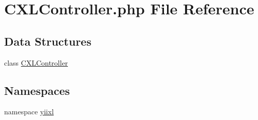 \hypertarget{CXLController_8php}{
\section{CXLController.php File Reference}
\label{CXLController_8php}
}
\subsection*{Data Structures}
\begin{DoxyCompactItemize}
\item 
class \hyperlink{classCXLController}{CXLController}
\end{DoxyCompactItemize}
\subsection*{Namespaces}
\begin{DoxyCompactItemize}
\item 
namespace \hyperlink{namespaceyiixl}{yiixl}
\end{DoxyCompactItemize}
